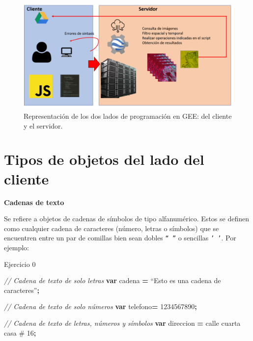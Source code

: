 \documentclass[
  12pt,
  letterpaper,
  twoside]{book}
\newenvironment{Shaded}{\begin{snugshade}}{\end{snugshade}}
\newcommand{\CommentTok}[1]{\textcolor[rgb]{0.56,0.35,0.01}{\textit{#1}}}
\newcommand{\KeywordTok}[1]{\textcolor[rgb]{0.13,0.29,0.53}{\textbf{#1}}}
\newcommand{\NormalTok}[1]{#1}
\newcommand{\OperatorTok}[1]{\textcolor[rgb]{0.81,0.36,0.00}{\textbf{#1}}}
\newcommand{\StringTok}[1]{\textcolor[rgb]{0.31,0.60,0.02}{#1}}
\begin{document}
\begin{figure}[btp]

{\centering \includegraphics[width=1\linewidth]{Img/daigFunc} 

}

\caption{Representación de los dos lados de programación en GEE: del cliente y el servidor.}\label{fig:unnamed-chunk-33}
\end{figure}

\hypertarget{tipos-de-objetos-del-lado-del-cliente}{%
\section{Tipos de objetos del lado del cliente}\label{tipos-de-objetos-del-lado-del-cliente}}

\textbf{Cadenas de texto}

Se refiere a objetos de cadenas de símbolos de tipo alfanumérico. Estos se definen como cualquier cadena de caracteres (número, letras o símbolos) que se encuentren entre un par de comillas bien sean dobles \texttt{“\ ”} o sencillas \texttt{’\ ’}. Por ejemplo:

Ejercicio 0

\begin{Shaded}
\begin{Highlighting}[]
\CommentTok{// Cadena de texto de solo letras}
\KeywordTok{var}\NormalTok{ cadena }\OperatorTok{=}\NormalTok{ “Esto es una cadena de caracteres”}\OperatorTok{;}

\CommentTok{// Cadena de texto de solo números}
\KeywordTok{var}\NormalTok{ telefono}\OperatorTok{=} \StringTok{\textquotesingle{}1234567890\textquotesingle{}}\OperatorTok{;}  
                     
\CommentTok{// Cadena de texto de letras, números y símbolos}
\KeywordTok{var}\NormalTok{ direccion }\OperatorTok{=} \StringTok{\textquotesingle{}calle cuarta casa \# 16\textquotesingle{}}\OperatorTok{;}
\end{Highlighting}
\end{Shaded}
\end{document}
